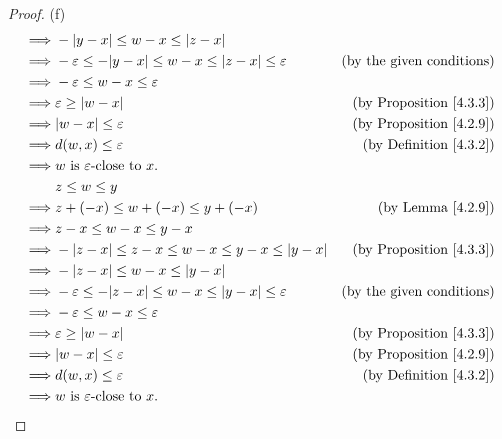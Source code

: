 \begin{proof}{(f)}
\begin{align*}
        \implies & -\abs*{y - x} \leq w - x \leq \abs*{z - x}                                                                          \\
        \implies & -\varepsilon \leq -\abs*{y - x} \leq w - x \leq \abs*{z - x} \leq \varepsilon & \text{(by the given conditions)}    \\
        \implies & -\varepsilon \leq w - x \leq \varepsilon                                                                            \\
        \implies & \varepsilon \geq \abs*{w - x}                                                 & \text{(by Proposition \ref{4.3.3})} \\
        \implies & \abs*{w - x} \leq \varepsilon                                                 & \text{(by Proposition \ref{4.2.9})} \\
        \implies & d(w, x) \leq \varepsilon                                                      & \text{(by Definition \ref{4.3.2})}  \\
        \implies & w \text{ is } \varepsilon\text{-close to } x.                                                                       \\
                 & z \leq w \leq y                                                                                                     \\
        \implies & z + (-x) \leq w + (-x) \leq y + (-x)                                          & \text{(by Lemma \ref{4.2.9})}       \\
        \implies & z - x \leq w - x \leq y - x                                                                                         \\
        \implies & -\abs*{z - x} \leq z - x \leq w - x \leq y - x \leq \abs*{y - x}              & \text{(by Proposition \ref{4.3.3})} \\
        \implies & -\abs*{z - x} \leq w - x \leq \abs*{y - x}                                                                          \\
        \implies & -\varepsilon \leq -\abs*{z - x} \leq w - x \leq \abs*{y - x} \leq \varepsilon & \text{(by the given conditions)}    \\
        \implies & -\varepsilon \leq w - x \leq \varepsilon                                                                            \\
        \implies & \varepsilon \geq \abs*{w - x}                                                 & \text{(by Proposition \ref{4.3.3})} \\
        \implies & \abs*{w - x} \leq \varepsilon                                                 & \text{(by Proposition \ref{4.2.9})} \\
        \implies & d(w, x) \leq \varepsilon                                                      & \text{(by Definition \ref{4.3.2})}  \\
        \implies & w \text{ is } \varepsilon\text{-close to } x.
    \end{align*}
\end{proof}

